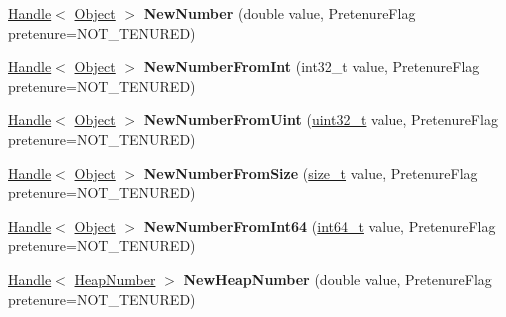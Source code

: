 \begin{DoxyCompactItemize}
\item 
\mbox{\label{classv8_1_1internal_1_1Factory_a21eb17d608263deab6022a270243e070}} 
\mbox{\hyperlink{classv8_1_1internal_1_1Handle}{Handle}}$<$ \mbox{\hyperlink{classv8_1_1internal_1_1Object}{Object}} $>$ {\bfseries New\+Number} (double value, Pretenure\+Flag pretenure=N\+O\+T\+\_\+\+T\+E\+N\+U\+R\+ED)
\item 
\mbox{\label{classv8_1_1internal_1_1Factory_a868a8f99947cd1cc54b9b86719595ae7}} 
\mbox{\hyperlink{classv8_1_1internal_1_1Handle}{Handle}}$<$ \mbox{\hyperlink{classv8_1_1internal_1_1Object}{Object}} $>$ {\bfseries New\+Number\+From\+Int} (int32\+\_\+t value, Pretenure\+Flag pretenure=N\+O\+T\+\_\+\+T\+E\+N\+U\+R\+ED)
\item 
\mbox{\label{classv8_1_1internal_1_1Factory_a0d298db79cbc1b6b56e3e37569dff5b5}} 
\mbox{\hyperlink{classv8_1_1internal_1_1Handle}{Handle}}$<$ \mbox{\hyperlink{classv8_1_1internal_1_1Object}{Object}} $>$ {\bfseries New\+Number\+From\+Uint} (\mbox{\hyperlink{classuint32__t}{uint32\+\_\+t}} value, Pretenure\+Flag pretenure=N\+O\+T\+\_\+\+T\+E\+N\+U\+R\+ED)
\item 
\mbox{\label{classv8_1_1internal_1_1Factory_a7cdc491e38de0624f615a5b12ace0feb}} 
\mbox{\hyperlink{classv8_1_1internal_1_1Handle}{Handle}}$<$ \mbox{\hyperlink{classv8_1_1internal_1_1Object}{Object}} $>$ {\bfseries New\+Number\+From\+Size} (\mbox{\hyperlink{classsize__t}{size\+\_\+t}} value, Pretenure\+Flag pretenure=N\+O\+T\+\_\+\+T\+E\+N\+U\+R\+ED)
\item 
\mbox{\label{classv8_1_1internal_1_1Factory_a3810bf861b54e90007a9cdd897101222}} 
\mbox{\hyperlink{classv8_1_1internal_1_1Handle}{Handle}}$<$ \mbox{\hyperlink{classv8_1_1internal_1_1Object}{Object}} $>$ {\bfseries New\+Number\+From\+Int64} (\mbox{\hyperlink{classint64__t}{int64\+\_\+t}} value, Pretenure\+Flag pretenure=N\+O\+T\+\_\+\+T\+E\+N\+U\+R\+ED)
\item 
\mbox{\label{classv8_1_1internal_1_1Factory_a9200e1335df4534f9dcb1f6bf56aeb5c}} 
\mbox{\hyperlink{classv8_1_1internal_1_1Handle}{Handle}}$<$ \mbox{\hyperlink{classv8_1_1internal_1_1HeapNumber}{Heap\+Number}} $>$ {\bfseries New\+Heap\+Number} (double value, Pretenure\+Flag pretenure=N\+O\+T\+\_\+\+T\+E\+N\+U\+R\+ED)

\end{DoxyCompactItemize}
